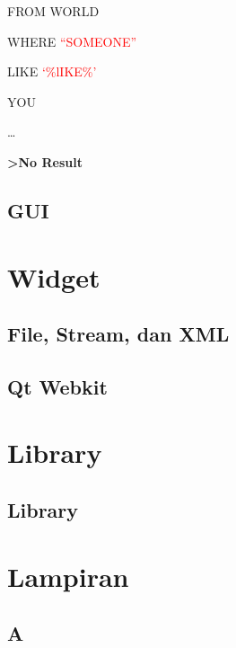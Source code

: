\documentclass[11pt,b5paper,oneside,titlepage]{book}
\begin{document}
FROM WORLD

WHERE \textcolor{red}{``SOMEONE''}

LIKE \textcolor{red}{`\%lIKE\%'}

YOU

\dots

\textbf{\textfractionsolidus{}\textgreater{}No Result}
\endgroup
	\chapter{GUI}
	

	\part{Widget}
	
	\chapter{File, Stream, dan XML}\label{file-stream-dan-xml}
	

	\chapter{Qt Webkit}
		
		
	\part{Library}
	\chapter{Library}\label{library}
	
	
	\appendix
	

	\backmatter
	\part{Lampiran}	

	\chapter{A}
	
	\printindex
\end{document}
